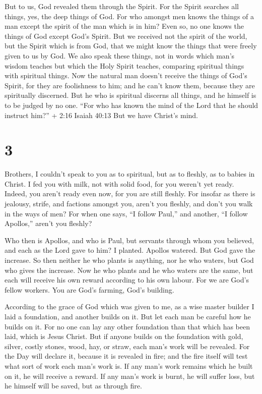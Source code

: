  But to us, God revealed them through the Spirit. For the
Spirit searches all things, yes, the deep things of God. 
For who amongst men knows the things of a man except the spirit of the
man which is in him? Even so, no one knows the things of God except
God's Spirit.  But we received not the spirit of the world,
but the Spirit which is from God, that we might know the things that
were freely given to us by God.  We also speak these
things, not in words which man's wisdom teaches but which the Holy
Spirit teaches, comparing spiritual things with spiritual things.
 Now the natural man doesn't receive the things of God's
Spirit, for they are foolishness to him; and he can't know them, because
they are spiritually discerned.  But he who is spiritual
discerns all things, and he himself is to be judged by no one.
 ``For who has known the mind of the Lord that he should
instruct him?'' + 2:16 Isaiah 40:13 But we have Christ's mind.

\hypertarget{section-2}{%
\section{3}\label{section-2}}

 Brothers, I couldn't speak to you as to spiritual, but as
to fleshly, as to babies in Christ.  I fed you with milk,
not with solid food, for you weren't yet ready. Indeed, you aren't ready
even now,  for you are still fleshly. For insofar as there
is jealousy, strife, and factions amongst you, aren't you fleshly, and
don't you walk in the ways of men?  For when one says, ``I
follow Paul,'' and another, ``I follow Apollos,'' aren't you fleshly?

 Who then is Apollos, and who is Paul, but servants through
whom you believed, and each as the Lord gave to him?  I
planted. Apollos watered. But God gave the increase.  So
then neither he who plants is anything, nor he who waters, but God who
gives the increase.  Now he who plants and he who waters are
the same, but each will receive his own reward according to his own
labour.  For we are God's fellow workers. You are God's
farming, God's building.

 According to the grace of God which was given to me, as a
wise master builder I laid a foundation, and another builds on it. But
let each man be careful how he builds on it.  For no one
can lay any other foundation than that which has been laid, which is
Jesus Christ.  But if anyone builds on the foundation with
gold, silver, costly stones, wood, hay, or straw,  each
man's work will be revealed. For the Day will declare it, because it is
revealed in fire; and the fire itself will test what sort of work each
man's work is.  If any man's work remains which he built on
it, he will receive a reward.  If any man's work is burnt,
he will suffer loss, but he himself will be saved, but as through fire.

